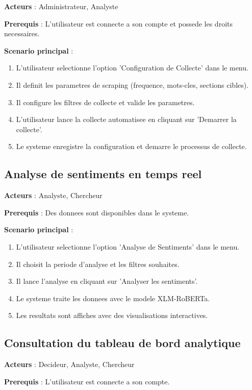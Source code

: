 \textbf{Acteurs} : Administrateur, Analyste

\textbf{Prerequis} : L'utilisateur est connecte a son compte et possede les droits necessaires.

\textbf{Scenario principal} :
\begin{enumerate}
    \item L'utilisateur selectionne l'option 'Configuration de Collecte' dans le menu.
    \item Il definit les parametres de scraping (frequence, mots-cles, sections cibles).
    \item Il configure les filtres de collecte et valide les parametres.
    \item L'utilisateur lance la collecte automatisee en cliquant sur 'Demarrer la collecte'.
    \item Le systeme enregistre la configuration et demarre le processus de collecte.
\end{enumerate}

\subsection{Analyse de sentiments en temps reel}

\textbf{Acteurs} : Analyste, Chercheur

\textbf{Prerequis} : Des donnees sont disponibles dans le systeme.

\textbf{Scenario principal} :
\begin{enumerate}
    \item L'utilisateur selectionne l'option 'Analyse de Sentiments' dans le menu.
    \item Il choisit la periode d'analyse et les filtres souhaites.
    \item Il lance l'analyse en cliquant sur 'Analyser les sentiments'.
    \item Le systeme traite les donnees avec le modele XLM-RoBERTa.
    \item Les resultats sont affiches avec des visualisations interactives.
\end{enumerate}

\subsection{Consultation du tableau de bord analytique}

\textbf{Acteurs} : Decideur, Analyste, Chercheur

\textbf{Prerequis} : L'utilisateur est connecte a son compte.

